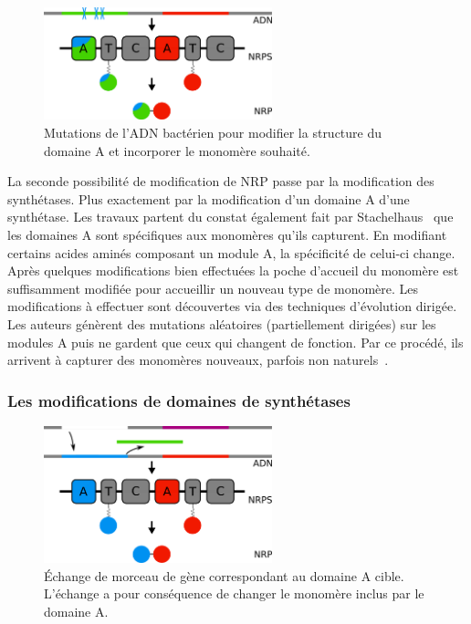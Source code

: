 \begin{figure}[h!]
  \begin{center}
    \includegraphics[width=250px]{Figures/synthese/mutations.png}
    \caption{\label{mutation}Mutations de l'ADN bactérien pour modifier la structure du domaine A et incorporer le monomère souhaité.}
  \end{center}
\end{figure}

La seconde possibilité de modification de NRP passe par la modification des synthétases.
Plus exactement par la modification d'un domaine A d'une synthétase.
Les travaux \cite{villiers_mapping_2009, kries_reprogramming_2014, williams_engineering_2013} partent du constat également fait par Stachelhaus~\cite{stachelhaus_specificity-conferring_1999} que les domaines A sont spécifiques aux monomères qu'ils capturent.
En modifiant certains acides aminés composant un module A, la spécificité de celui-ci change.
Après quelques modifications bien effectuées la poche d'accueil du monomère est suffisamment modifiée pour accueillir un nouveau type de monomère.
Les modifications à effectuer sont découvertes via des techniques d'évolution dirigée.
Les auteurs génèrent des mutations aléatoires (partiellement dirigées) sur les modules A puis ne gardent que ceux qui changent de fonction.
Par ce procédé, ils arrivent à capturer des monomères nouveaux, parfois non naturels~\cite{thirlway_introduction_2012}.



\subsubsection{Les modifications de domaines de synthétases}

\begin{figure}[h!]
  \begin{center}
    \includegraphics[width=250px]{Figures/synthese/echange.png}
    \caption{\label{echange}Échange de morceau de gène correspondant au domaine A cible.
    L'échange a pour conséquence de changer le monomère inclus par le domaine A.}
  \end{center}
\end{figure}


